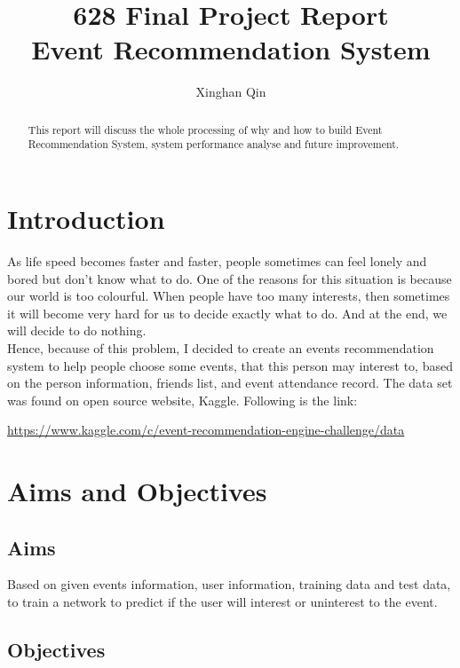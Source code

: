 \documentclass{article}
\title{628 Final Project Report\\
Event Recommendation System}
\author{%
  Xinghan Qin
}
\begin{document}

\maketitle

\begin{abstract}
This report will discuss the whole processing of why and how to build Event Recommendation System, system performance analyse and future improvement.
\end{abstract}

\section{Introduction}

As life speed becomes faster and faster, people sometimes can feel lonely and bored but don’t know what to do. One of the reasons for this situation is because our world is too colourful. When people have too many interests, then sometimes it will become very hard for us to decide exactly what to do. And at the end, we will decide to do nothing.\\

Hence, because of this problem, I decided to create an events recommendation system to help people choose some events, that this person may interest to, based on the person information, friends list, and event attendance record. The data set was found on open source website, Kaggle. Following is the link:

\begin{center}
  \url{https://www.kaggle.com/c/event-recommendation-engine-challenge/data}
\end{center}

\section{Aims and Objectives}

\subsection{Aims}

Based on given events information, user information, training data and test data, to train a network to predict if the user will interest or uninterest to the event.

\subsection{Objectives}
\end{document}
